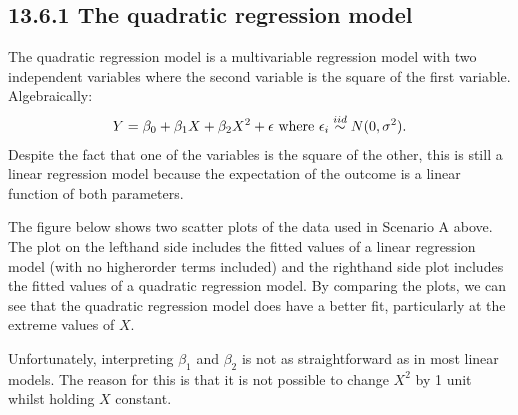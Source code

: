 \documentclass[letterpaper,10pt,english]{jupyterBook}
\let\sphinxpxdimen\pdfpxdimen\else\newdimen\sphinxpxdimen
\begin{document}
\subsection{13.6.1 The quadratic regression model}
\label{\detokenize{13.f. Linear Regression II:the-quadratic-regression-model}}
\sphinxAtStartPar
The quadratic regression model is a multivariable regression model with two independent variables where the second variable is the square of the first variable. Algebraically:
\begin{equation*}
\begin{split}
Y = \beta_0 + \beta_1 X + \beta_2 X^2 + \epsilon \text{ where }  \epsilon_i \overset{\small{iid}}{\sim} N(0, \sigma^2).
\end{split}
\end{equation*}
\sphinxAtStartPar
Despite the fact that one of the variables is the square of the other, this is still a linear regression model because the expectation of the outcome is a linear function of both parameters.

\sphinxAtStartPar
The figure below shows two scatter plots of the data used in Scenario A above. The plot on the left\sphinxhyphen{}hand side includes the fitted values of a linear regression model (with no higher\sphinxhyphen{}order terms included) and the right\sphinxhyphen{}hand side plot includes the fitted values of a quadratic regression model. By comparing the plots, we can see that the quadratic regression model does have a better fit, particularly at the extreme values of \(X\).

\begin{figure}[htbp]
\centering

\noindent\sphinxincludegraphics[height=600\sphinxpxdimen]{{quadratic_example}.png}
\end{figure}

\sphinxAtStartPar
Unfortunately, interpreting \(\beta_1\) and \(\beta_2\) is not as straightforward as in most linear models. The reason for this is that it is not possible to change \(X^2\) by 1 unit whilst holding \(X\) constant.
\end{document}
